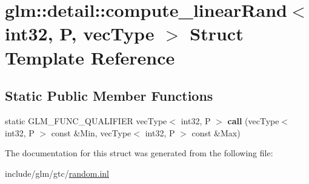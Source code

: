 \hypertarget{structglm_1_1detail_1_1compute__linearRand_3_01int32_00_01P_00_01vecType_01_4}{}\section{glm\+:\+:detail\+:\+:compute\+\_\+linear\+Rand$<$ int32, P, vec\+Type $>$ Struct Template Reference}
\label{structglm_1_1detail_1_1compute__linearRand_3_01int32_00_01P_00_01vecType_01_4}
\subsection*{Static Public Member Functions}
\begin{DoxyCompactItemize}
\item 
\mbox{\label{structglm_1_1detail_1_1compute__linearRand_3_01int32_00_01P_00_01vecType_01_4_ac09eec8e177afcecc1e0d52d6d9951b3}} 
static G\+L\+M\+\_\+\+F\+U\+N\+C\+\_\+\+Q\+U\+A\+L\+I\+F\+I\+ER vec\+Type$<$ int32, P $>$ {\bfseries call} (vec\+Type$<$ int32, P $>$ const \&Min, vec\+Type$<$ int32, P $>$ const \&Max)
\end{DoxyCompactItemize}


The documentation for this struct was generated from the following file\+:\begin{DoxyCompactItemize}
\item 
include/glm/gtc/\hyperlink{random_8inl}{random.\+inl}\end{DoxyCompactItemize}
